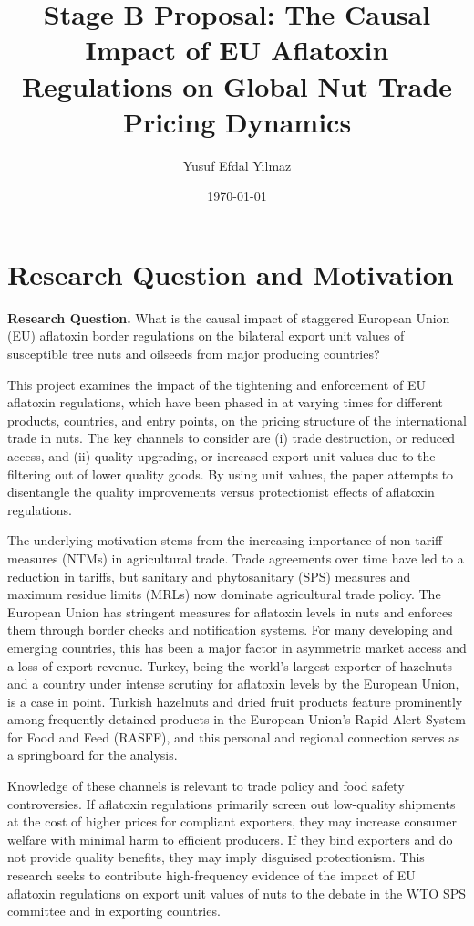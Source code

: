 \documentclass[12pt]{article}
\title{\textbf{Stage B Proposal: The Causal Impact of EU Aflatoxin Regulations on Global Nut Trade Pricing Dynamics}}
\author{Yusuf Efdal Y{\i}lmaz}
\date{\today}
\begin{document}
\maketitle

\section{Research Question and Motivation}

\textbf{Research Question.} What is the causal impact of staggered European Union (EU) aflatoxin border regulations on the bilateral export unit values of susceptible tree nuts and oilseeds from major producing countries?

This project examines the impact of the tightening and enforcement of EU aflatoxin regulations, which have been phased in at varying times for different products, countries, and entry points, on the pricing structure of the international trade in nuts. The key channels to consider are (i) trade destruction, or reduced access, and (ii) quality upgrading, or increased export unit values due to the filtering out of lower quality goods. By using unit values, the paper attempts to disentangle the quality improvements versus protectionist effects of aflatoxin regulations.

The underlying motivation stems from the increasing importance of non-tariff measures (NTMs) in agricultural trade. Trade agreements over time have led to a reduction in tariffs, but sanitary and phytosanitary (SPS) measures and maximum residue limits (MRLs) now dominate agricultural trade policy. The European Union has stringent measures for aflatoxin levels in nuts and enforces them through border checks and notification systems. For many developing and emerging countries, this has been a major factor in asymmetric market access and a loss of export revenue. Turkey, being the world's largest exporter of hazelnuts and a country under intense scrutiny for aflatoxin levels by the European Union, is a case in point. Turkish hazelnuts and dried fruit products feature prominently among frequently detained products in the European Union's Rapid Alert System for Food and Feed (RASFF), and this personal and regional connection serves as a springboard for the analysis.

Knowledge of these channels is relevant to trade policy and food safety controversies. If aflatoxin regulations primarily screen out low-quality shipments at the cost of higher prices for compliant exporters, they may increase consumer welfare with minimal harm to efficient producers. If they bind exporters and do not provide quality benefits, they may imply disguised protectionism. This research seeks to contribute high-frequency evidence of the impact of EU aflatoxin regulations on export unit values of nuts to the debate in the WTO SPS committee and in exporting countries.
\end{document}
